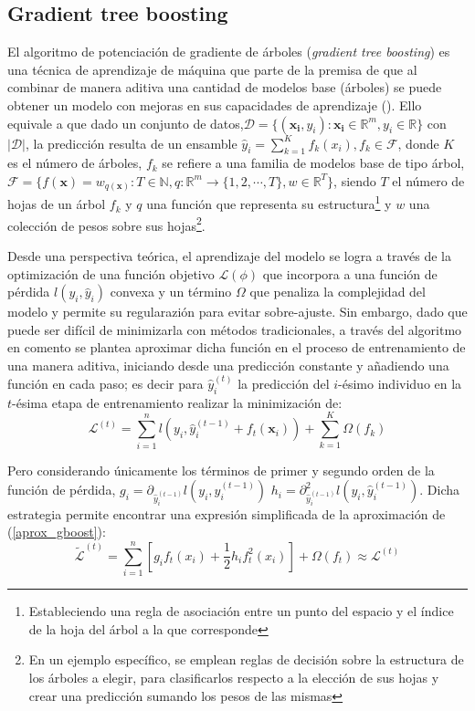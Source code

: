 \documentclass[9pt,twocolumn,twoside]{ilcss}
\begin{document}
\subsection{Gradient tree boosting}
El algoritmo de potenciación de gradiente de árboles (\emph{gradient tree boosting}) es una técnica de aprendizaje de máquina que parte de la premisa de que al combinar de manera aditiva una cantidad de modelos base (árboles) se puede obtener un modelo con mejoras en sus capacidades de aprendizaje (\cite{Chen:2016:XST:2939672.2939785}). Ello equivale a que dado un conjunto de datos,${\mathcal D} =\{(\mathbf{x_i}, y_i) : \mathbf{x_i}\in  \mathbb{R}^m, y_i\in  \mathbb{R} \}$ con $|{\mathcal D}|$, la predicción resulta de un ensamble $\hat{y}_i = \sum_{k=1}^K f_k(x_i), f_k \in \mathcal{F}$, donde $K$ es el número de árboles, $f_k$ se refiere a una familia de modelos base de tipo árbol, $\mathcal{F}=\{ f(\mathbf{x}) = w_{q(\mathbf{x})} :  T\in \mathbb{N}, q: \mathbb{R}^m \rightarrow \{1,2,\cdots,T\} ,  w\in \mathbb{R}^T  \}$, siendo $T$ el número de hojas de un árbol $f_k$ y $q$ una función que representa su estructura\footnote{Estableciendo una regla de asociación entre un punto del espacio y el índice de la hoja del árbol a la que corresponde} y $w$ una colección de pesos sobre sus hojas\footnote{En un ejemplo específico, se emplean reglas de decisión sobre la estructura de los árboles a elegir, para clasificarlos respecto a la elección de sus hojas y crear una predicción sumando los pesos de las mismas}.

Desde una perspectiva teórica, el aprendizaje del modelo se logra a través de la optimización de una función objetivo ${\mathcal L}(\phi)$ que incorpora a una función de pérdida $l(y_i, \hat{y}_i)$ convexa 
y un término $\Omega$ que penaliza la complejidad del modelo y permite su regularazión para evitar sobre-ajuste. Sin embargo, dado que puede ser difícil de minimizarla con métodos tradicionales, a través del algoritmo en comento se plantea aproximar dicha función en el proceso de entrenamiento de una manera aditiva, iniciando desde una predicción constante y añadiendo una función en cada paso; es decir para $\hat{y}_i^{(t)}$ la predicción del $i$-ésimo individuo en la $t$-ésima etapa de entrenamiento realizar la minimización de:
\begin{equation}\label{aprox_gboost}
{\mathcal L}^{(t)} = \sum_{i=1}^n l(y_i, \hat{y}_i^{(t-1)}+f_t(\mathbf{x}_i)) + \sum_{k=1}^K \Omega(f_k)
\end{equation}

Pero considerando únicamente los términos de primer y segundo orden de la función de pérdida, $g_i = \partial_{\hat{y}_i^{(t-1)}} l(y_i, \hat{y}_i^{(t-1)})$  $h_i = \partial_{\hat{y}_i^{(t-1)}}^2 l(y_i, \hat{y}_i^{(t-1)})$. Dicha estrategia permite encontrar una expresión simplificada de la aproximación de (\ref{aprox_gboost}):
\begin{equation}
\tilde{{\mathcal L}}^{(t)} =\sum_{i=1}^n [g_i f_t(x_i) + \frac{1}{2} h_i f_t^2(x_i)] + \Omega(f_t) \approx {\mathcal L}^{(t)}
\end{equation}
\end{document}
